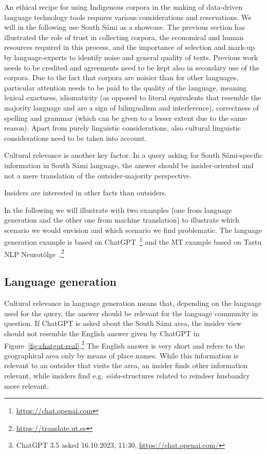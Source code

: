 \documentclass[free]{flammie}
\begin{document}
An ethical recipe for using Indigenous corpora in the making of data-driven
language technology tools requires various considerations and reservations. We
will in the following use South Sámi as a showcase.  The previous section has
illustrated the role of trust in collecting corpora, the economical and human
resources required in this process, and the importance of selection and mark-up
by language-experts to identify noise and general quality of texts. Previous
work needs to be credited and agreements need to be kept also in secondary use
of the corpora.  Due to the fact that corpora are noisier than for other
languages, particular attention needs to be paid to the quality of the language,
meaning lexical exactness, idiomaticity (as opposed to literal equivalents that
resemble the majority language and are a sign of bilingualism and interference),
correctness of spelling and grammar (which can be given to a lesser extent due
to the same reason).  Apart from purely linguistic considerations, also cultural
linguistic considerations need to be taken into account.

Cultural relevance is another key factor. In a query asking for South
Sámi-specific information in South Sámi language, the answer should be
insider-oriented and not a mere translation of the outsider-majority
perspective.

Insiders are interested in other facts than outsiders.

In the following we will illustrate with two examples (one from language
generation and the other one from machine translation) to illustrate which
scenario we would envision and which scenario we find problematic.  The language
generation example is based on
ChatGPT~\cite{brown2020language}\footnote{\url{https://chat.openai.com}} and the
MT example based on Tartu NLP
Neurotõlge~\cite{yankovskaya-etal-2023-machine}.\footnote{\url{https://translate.ut.ee}}

\subsection{Language generation}

Cultural relevance in language generation means that, depending on the language
used for the query, the answer should be relevant for the language community in
question.  If ChatGPT is asked about the South Sámi area, the insider view
should not resemble the English answer given by ChatGPT in
Figure~\ref{fig:chatgpt-real}.\footnote{\smaller{} ChatGPT 3.5 asked 16.10.2023,
11:30, \url{https://chat.openai.com/}} The English answer is very short and
refers to the geographical area only by means of place names. While this
information is relevant to an outsider that visits the area, an insider finds
other information relevant, while insiders find e.g. \textit{siida}-structures
related to reindeer husbandry more relevant.
\end{document}

